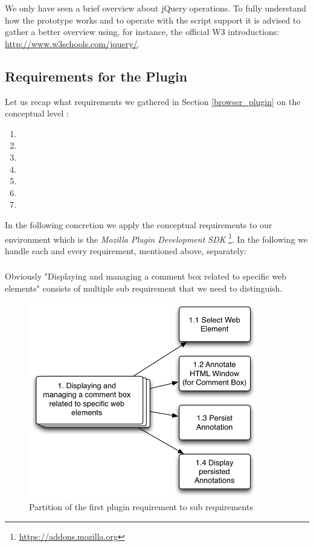 We only have seen a brief overview about jQuery operations. To fully understand how the prototype works and to operate with the script support it is advised to gather a better overview using, for instance, the official W3 introductions: \url{http://www.w3schools.com/jquery/}. 

\newpage
\subsection{Requirements for the Plugin}\label{firefox_plugin_requirements}
Let us recap what requirements we gathered in Section \ref{browser_plugin} on the conceptual level \cite{van2009requirements}:

\begin{enumerate}
\item \reqPi
\item \reqPii
\item \reqPiii
\item \reqPiv
\item \reqPv
\item \reqPvi
\item \reqPvii
\end{enumerate}

In the following concretion we apply the conceptual requirements to our environment which is the \emph{Mozilla Plugin Development SDK} \footnote{\url{https://addons.mozilla.org}}. In the following we handle each and every requirement, mentioned above, separately:

\subsubsection[Visualizing]{\reqPi}\label{display-management-requirement}
Obviously "Displaying and managing a comment box related to specific web elements" consists of multiple sub requirement that we need to distinguish. 

\begin{figure}\centering
		\includegraphics[width=10cm]{images/abstract2concrete-1.png}
		\caption{Partition of the first plugin requirement to sub requirements}
		\label{abstract2concrete-1}
\end{figure} 

